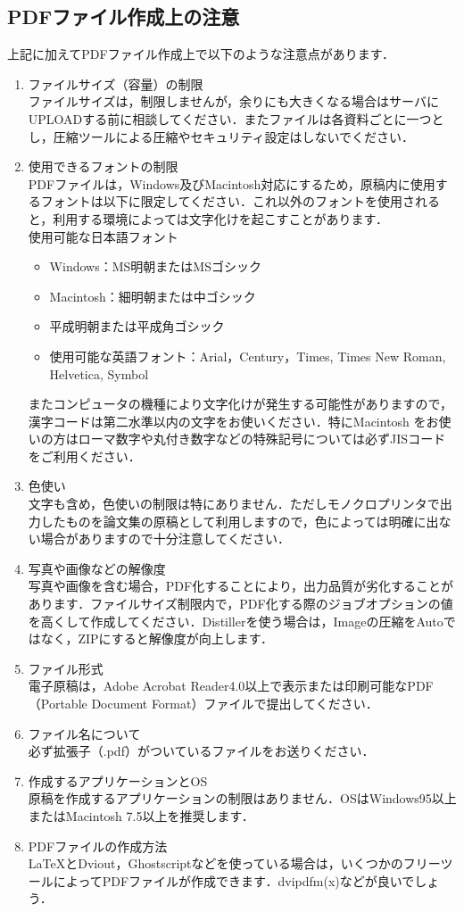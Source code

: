 \documentclass[a4j]{jarticle}
\begin{document}
\begin{Abstract}
\section{PDFファイル作成上の注意}
上記に加えてPDFファイル作成上で以下のような注意点があります．
\begin{enumerate}
  \item ファイルサイズ（容量）の制限 \\
ファイルサイズは，制限しませんが，余りにも大きくなる場合はサーバにUPLOADする前に相談してください．またファイルは各資料ごとに一つとし，圧縮ツールによる圧縮やセキュリティ設定はしないでください．
  \item 使用できるフォントの制限 \\
PDFファイルは，Windows及びMacintosh対応にするため，原稿内に使用するフォントは以下に限定してください．これ以外のフォントを使用されると，利用する環境によっては文字化けを起こすことがあります．
\\
使用可能な日本語フォント
\begin{itemize}
  \item Windows：MS明朝またはMSゴシック
  \item Macintosh：細明朝または中ゴシック
  \item 平成明朝または平成角ゴシック
  \item 使用可能な英語フォント：Arial，Century，Times, Times New Roman, Helvetica, Symbol
\end{itemize}
またコンピュータの機種により文字化けが発生する可能性がありますので，漢字コードは第二水準以内の文字をお使いください．特にMacintosh をお使いの方はローマ数字や丸付き数字などの特殊記号については必ずJISコードをご利用ください．

  \item 色使い \\
文字も含め，色使いの制限は特にありません．ただしモノクロプリンタで出力したものを論文集の原稿として利用しますので，色によっては明確に出ない場合がありますので十分注意してください．
  \item 写真や画像などの解像度 \\
写真や画像を含む場合，PDF化することにより，出力品質が劣化することがあります．ファイルサイズ制限内で，PDF化する際のジョブオプションの値を高くして作成してください．Distillerを使う場合は，Imageの圧縮をAutoではなく，ZIPにすると解像度が向上します．
  \item ファイル形式 \\
電子原稿は，Adobe Acrobat Reader4.0以上で表示または印刷可能なPDF（Portable Document Format）ファイルで提出してください．
  \item ファイル名について \\
必ず拡張子（.pdf）がついているファイルをお送りください．
  \item 作成するアプリケーションとOS \\
原稿を作成するアプリケーションの制限はありません．OSはWindows95以上またはMacintosh 7.5以上を推奨します．
  \item PDFファイルの作成方法 \\
{\LaTeX}とDviout，Ghostscriptなどを使っている場合は，いくつかのフリーツールによってPDFファイルが作成できます．dvipdfm(x)などが良いでしょう．


\end{enumerate}
\end{Abstract}
\end{document}
